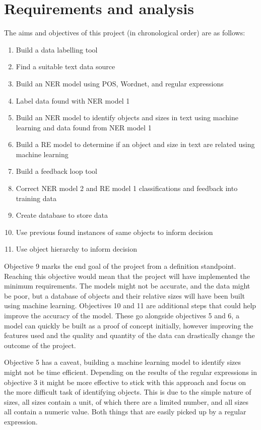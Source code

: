 \chapter{Requirements and analysis}

The aims and objectives of this project (in chronological order) are as follows:

\begin{enumerate}
\item Build a data labelling tool
\item Find a suitable text data source
\item Build an NER model using POS, Wordnet, and regular expressions
\item Label data found with NER model 1
\item Build an NER model to identify objects and sizes in text using machine learning and data found from NER model 1
\item Build a RE model to determine if an object and size in text are related using machine learning
\item Build a feedback loop tool
\item Correct NER model 2 and RE model 1 classifications and feedback into training data
\item Create database to store data
\item Use previous found instances of same objects to inform decision
\item Use object hierarchy to inform decision
\end{enumerate}

Objective 9 marks the end goal of the project from a definition standpoint. Reaching this objective would mean that the project will have implemented the minimum requirements. The models might not be accurate, and the data might be poor, but a database of objects and their relative sizes will have been built using machine learning. Objectives 10 and 11 are additional steps that could help improve the accuracy of the model. These go alongside objectives 5 and 6, a model can quickly be built as a proof of concept initially, however improving the features used and the quality and quantity of the data can drastically change the outcome of the project.

Objective 5 has a caveat, building a machine learning model to identify sizes might not be time efficient. Depending on the results of the regular expressions in objective 3 it might be more effective to stick with this approach and focus on the more difficult task of identifying objects. This is due to the simple nature of sizes, all sizes contain a unit, of which there are a limited number, and all sizes all contain a numeric value. Both things that are easily picked up by a regular expression.

